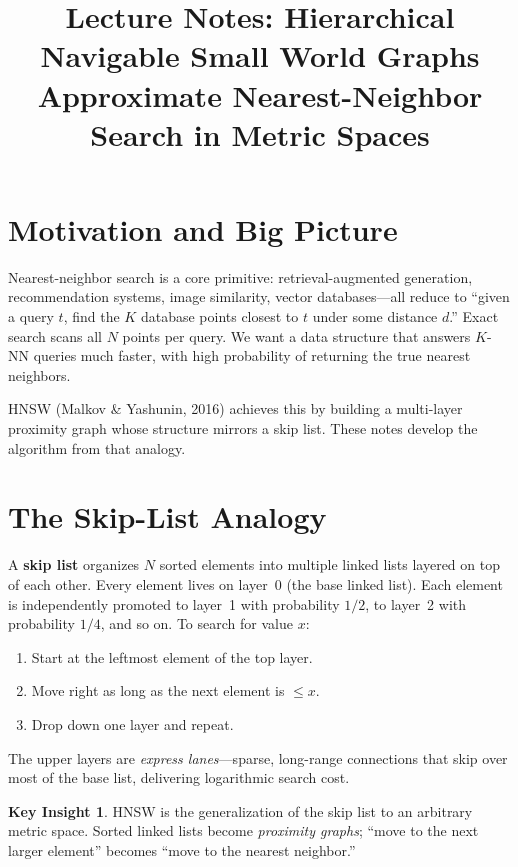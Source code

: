 \documentclass[11pt]{article}
\title{\textbf{Lecture Notes: Hierarchical Navigable Small World Graphs}\\
\large Approximate Nearest-Neighbor Search in Metric Spaces}
\author{}
\date{}
\theoremstyle{definition}
\newtheorem{insight}{Key Insight}
\begin{document}
\maketitle
\tableofcontents
\newpage

\section{Motivation and Big Picture}

Nearest-neighbor search is a core primitive: retrieval-augmented generation, recommendation systems, image similarity, vector databases---all reduce to ``given a query $t$, find the $K$ database points closest to $t$ under some distance $d$.'' Exact search scans all $N$ points per query. We want a data structure that answers $K$-NN queries much faster, with high probability of returning the true nearest neighbors.

HNSW (Malkov \& Yashunin, 2016) achieves this by building a multi-layer proximity graph whose structure mirrors a skip list. These notes develop the algorithm from that analogy.

\section{The Skip-List Analogy}
\label{sec:skiplist}

A \textbf{skip list} organizes $N$ sorted elements into multiple linked lists layered on top of each other. Every element lives on layer~0 (the base linked list). Each element is independently promoted to layer~1 with probability $1/2$, to layer~2 with probability $1/4$, and so on. To search for value $x$:
\begin{enumerate}
  \item Start at the leftmost element of the top layer.
  \item Move right as long as the next element is $\leq x$.
  \item Drop down one layer and repeat.
\end{enumerate}
The upper layers are \emph{express lanes}---sparse, long-range connections that skip over most of the base list, delivering logarithmic search cost.

\begin{insight}
  HNSW is the generalization of the skip list to an arbitrary metric space. Sorted linked lists become \emph{proximity graphs}; ``move to the next larger element'' becomes ``move to the nearest neighbor.''
\end{insight}
\end{document}
